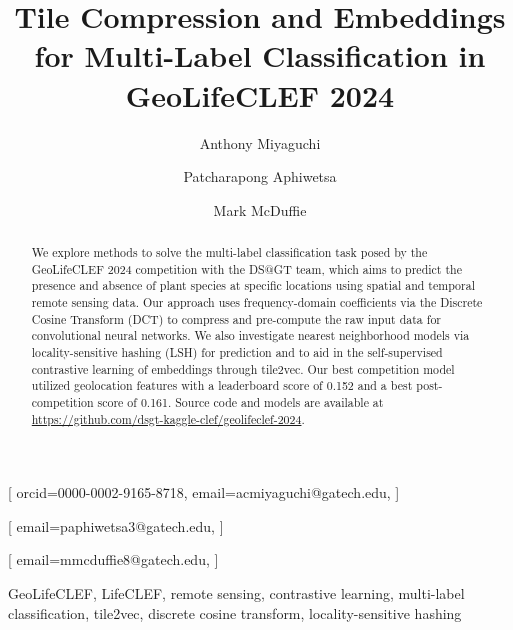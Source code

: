 

\title{Tile Compression and Embeddings for Multi-Label Classification in GeoLifeCLEF 2024}

\author[1]{Anthony Miyaguchi}[
orcid=0000-0002-9165-8718,
email=acmiyaguchi@gatech.edu,
]
\cormark[1]
\author[1]{Patcharapong Aphiwetsa}[
email=paphiwetsa3@gatech.edu,
]
\author[1]{Mark McDuffie}[
email=mmcduffie8@gatech.edu,
]

\address[1]{Georgia Institute of Technology, North Ave NW, Atlanta, GA 30332}

\begin{abstract}
We explore methods to solve the multi-label classification task posed by the GeoLifeCLEF 2024 competition with the DS@GT team, which aims to predict the presence and absence of plant species at specific locations using spatial and temporal remote sensing data. 
Our approach uses frequency-domain coefficients via the Discrete Cosine Transform (DCT) to compress and pre-compute the raw input data for convolutional neural networks.
We also investigate nearest neighborhood models via locality-sensitive hashing (LSH) for prediction and to aid in the self-supervised contrastive learning of embeddings through tile2vec.
Our best competition model utilized geolocation features with a leaderboard score of 0.152 and a best post-competition score of 0.161.
Source code and models are available at \url{https://github.com/dsgt-kaggle-clef/geolifeclef-2024}.
\end{abstract}

\begin{keywords}
  GeoLifeCLEF,
  LifeCLEF,
  remote sensing,
  contrastive learning,
  multi-label classification,
  tile2vec,
  discrete cosine transform,
  locality-sensitive hashing
\end{keywords}
